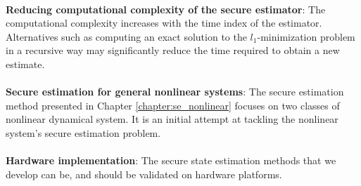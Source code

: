\documentclass[../thesis.tex]{subfiles}
\begin{document}
\\
\textbf{Reducing computational complexity of the secure estimator}: The computational complexity increases with the time index of the estimator. Alternatives such as computing an exact solution to the $l_1$-minimization problem in a recursive way may significantly reduce the time required to obtain a new estimate.\\
\\
\textbf{Secure estimation for general nonlinear systems}: The secure estimation method presented in Chapter \ref{chapter:se_nonlinear} focuses on two classes of nonlinear dynamical system. It is an initial attempt at tackling the nonlinear system's secure estimation problem. \\
\\
\textbf{Hardware implementation}: The secure state estimation methods that we develop can be, and should be validated on hardware platforms. 
\end{document}
